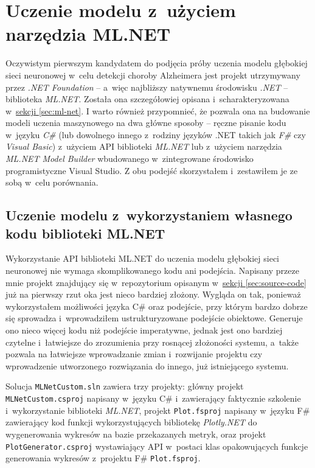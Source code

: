 \section{Uczenie modelu z~użyciem narzędzia ML.NET}

Oczywistym pierwszym kandydatem do podjęcia próby uczenia modelu głębokiej sieci neuronowej w~celu detekcji choroby Alzheimera jest projekt utrzymywany przez \emph{.NET Foundation} -- a~więc najbliższy natywnemu środowisku \emph{.NET} -- biblioteka \emph{ML.NET}.
Została ona szczegółowiej opisana i~scharakteryzowana w~\hyperref[sec:ml-net]{sekcji \ref*{sec:ml-net}}.
I warto również przypomnieć, że pozwala ona na budowanie modeli uczenia maszynowego na dwa główne sposoby -- ręczne pisanie kodu w~języku \emph{C\#} (lub dowolnego innego z~rodziny języków .NET takich jak \emph{F\#} czy \emph{Visual Basic}) z~użyciem API biblioteki \emph{ML.NET} lub z~użyciem narzędzia \emph{ML.NET Model Builder} wbudowanego w~zintegrowane środowisko programistyczne Visual Studio.
Z obu podejść skorzystałem i~zestawiłem je ze sobą w~celu porównania.

\subsection{Uczenie modelu z~wykorzystaniem własnego kodu biblioteki ML.NET}

Wykorzystanie API biblioteki ML.NET do uczenia modelu głębokiej sieci neuronowej nie wymaga skomplikowanego kodu ani podejścia.
Napisany przeze mnie projekt znajdujący się w~repozytorium opisanym w~\hyperref[sec:source-code]{sekcji \ref*{sec:source-code}} już na pierwszy rzut oka jest nieco bardziej złożony.
Wygląda on tak, ponieważ wykorzystałem możliwości języka C\# oraz podejście, przy którym bardzo dobrze się sprowadza i~wprowadziłem ustrukturyzowane podejście obiektowe.
Generuje ono nieco więcej kodu niż podejście imperatywne, jednak jest ono bardziej czytelne i~łatwiejsze do zrozumienia przy rosnącej złożoności systemu, a~także pozwala na łatwiejsze wprowadzanie zmian i~rozwijanie projektu czy wprowadzenie utworzonego rozwiązania do innego, już istniejącego systemu.

Solucja \lstinline{MLNetCustom.sln} zawiera trzy projekty: główny projekt \lstinline{MLNetCustom.csproj} napisany w~języku C\# i~zawierający faktycznie szkolenie i~wykorzystanie biblioteki \emph{ML.NET}, projekt \lstinline{Plot.fsproj} napisany w~języku F\# zawierający kod funkcji wykorzystujących bibliotekę \emph{Plotly.NET} do wygenerowania wykresów na bazie przekazanych metryk, oraz projekt \lstinline{PlotGenerator.csproj} wystawiający API w~postaci klas opakowujących funkcje generowania wykresów z~projektu F\# \lstinline{Plot.fsproj}.

